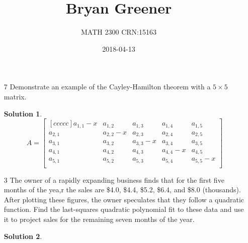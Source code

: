 \documentclass[12pt]{article}
\title{Bryan Greener}
\author{MATH 2300 CRN:15163}
\date{2018-04-13}
\theoremstyle{definition}
\newtheorem*{solution}{Solution} %
\theoremstyle{plain}
\begin{document}
\maketitle

\TabPositions{4cm}

\begin{enumerate}
\item[7]Demonstrate an example of the Cayley-Hamilton theorem with a $5\times 5$ matrix.
	\begin{solution}
	\[ A=\begin{bmatrix}[ccccc]
		a_{1,1}-x&a_{1,2}&a_{1,3}&a_{1,4}&a_{1,5}\\
		a_{2,1}&a_{2,2}-x&a_{2,3}&a_{2,4}&a_{2,5}\\
		a_{3,1}&a_{3,2}&a_{3,3}-x&a_{3,4}&a_{3,5}\\
		a_{4,1}&a_{4,2}&a_{4,3}&a_{4,4}-x&a_{4,5}\\
		a_{5,1}&a_{5,2}&a_{5,3}&a_{5,4}&a_{5,5}-x\\\end{bmatrix} \]
	\end{solution}
\item[3]The owner of a rapidly expanding business finds that for the first five months of the yea,r the sales are \$4.0, \$4.4, \$5.2, \$6.4, and \$8.0 (thousands). After plotting these figures, the owner speculates that they follow a quadratic function. Find the last-squares quadratic polynomial fit to these data and use it to project sales for the remaining seven months of the year.
	\begin{solution}
	
	\end{solution}
\end{enumerate}
\end{document}
